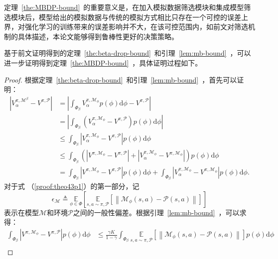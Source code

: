 定理~\ref{the:MBDP-bound}~的重要意义是，在加入模拟数据筛选模块和集成模型筛选模块后，模型给出的模拟数据与传统的模拟方式相比只存在一个可控的误差上界，对强化学习的训练带来的误差影响并不大，在该可控范围内，如前文对筛选机制的具体描述，本论文能够得到鲁棒性更好的决策策略。

基于前文证明得到的定理~\ref{the:beta-drop-bound}~和引理~\ref{lem:mb-bound}~，可以进一步证明得到定理~\ref{the:MBDP-bound}~，具体证明过程如下。

\begin{proof}

根据定理~\ref{the:beta-drop-bound}~和引理~\ref{lem:mb-bound}~，首先可以证明：
\begin{equation}
\begin{aligned}
\left|{V}_\alpha^{\pi, \mathcal{M}^\beta}-{V}^{\pi, \mathcal{P}}\right|&=\left|\int_{\Phi_\beta}{V}_\alpha^{\pi, \mathcal{M}_{\phi}}p(\phi)\mathrm{d}\phi-{V}^{\pi, \mathcal{P}}\right| \\
&=\left|\int_{\Phi_\beta}\left({V}_\alpha^{\pi, \mathcal{M}_{\phi}}-{V}^{\pi, \mathcal{P}}\right)p(\phi)\mathrm{d}\phi\right| \\
&\leq\int_{\Phi_\beta}\left|{V}_\alpha^{\pi, \mathcal{M}_{\phi}}-{V}^{\pi, \mathcal{P}}\right|p(\phi)\mathrm{d}\phi\\
&\leq\int_{\Phi_\beta}\left(\left|{V}^{\pi, \mathcal{M}_{\phi}}-{V}^{\pi, \mathcal{P}}\right|+\left|{V}_\alpha^{\pi, \mathcal{M}_{\phi}} - {V}^{\pi,\mathcal{M}_{\phi}}\right|\right)p(\phi)\mathrm{d}\phi\\
&= \int_{\Phi_\beta}\left|{V}^{\pi, \mathcal{M}_{\phi}}-{V}^{\pi, \mathcal{P}}\right|p(\phi)\mathrm{d}\phi+\int_{\Phi_\beta}\left|{V}_\alpha^{\pi, \mathcal{M}_{\phi}} - {V}^{\pi,\mathcal{M}_{\phi}}\right|p(\phi)\mathrm{d}\phi. \label{proof:theo43p1}
\end{aligned}
\end{equation}
对于式 （\ref{proof:theo43p1}）的第一部分，记
\begin{equation}
\epsilon_{\mathcal{M}}\triangleq\underset{\phi\in\Phi}{\mathbb{E}}\left[\underset{s,a\sim \pi,\mathcal{P}}{\mathbb{E}}\left[\left\|\mathcal{M}_\phi(s, a)-\mathcal{P}(s, a)\right\|\right]\right]
\end{equation}
表示在模型$\mathcal{M}$和环境$\mathcal{P}$之间的一般性偏差。根据引理~\ref{lem:mb-bound}~，可以求得：
\begin{equation}
\begin{aligned}
\int_{\Phi_\beta}\left|{V}^{\pi, \mathcal{M}_{\phi}}-{V}^{\pi, \mathcal{P}}\right|p(\phi)\mathrm{d}\phi &\leq \frac{\gamma K}{1-\gamma}\int_{\Phi_\beta}\underset{s,a\sim\pi,\mathcal{P}}{\mathbb{E}}\left[\left\|\mathcal{M}_\phi(s, a)-\mathcal{P}(s, a)\right\|\right]p(\phi)\mathrm{d}\phi\\

\end{aligned}
\end{equation}
\end{proof}
